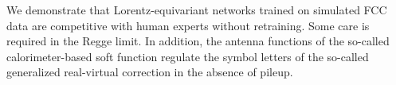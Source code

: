 We demonstrate that Lorentz-equivariant networks trained on simulated
FCC data are competitive with human experts without retraining. Some
care is required in the Regge limit. In addition, the antenna functions
of the so-called calorimeter-based soft function regulate the symbol
letters of the so-called generalized real-virtual correction in the
absence of pileup.


